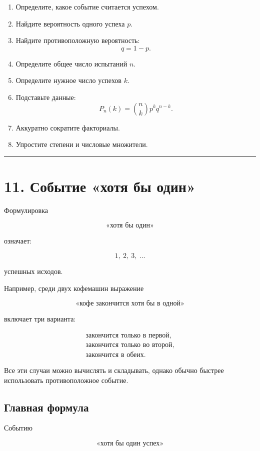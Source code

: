 \documentclass[a4paper,12pt]{article}
\newcommand{\accentline}{%
    \par\noindent
    {\color{accent}\rule{\linewidth}{0.7pt}}
    \par
}
\begin{document}
\begin{enumerate}
    \item Определите, какое событие считается успехом.
    \item Найдите вероятность одного успеха $p$.
    \item Найдите противоположную вероятность:
    \[
    q=1-p.
    \]
    \item Определите общее число испытаний $n$.
    \item Определите нужное число успехов $k$.
    \item Подставьте данные:
    \[
    P_n(k)
    =
    \binom{n}{k}p^kq^{n-k}.
    \]
    \item Аккуратно сократите факториалы.
    \item Упростите степени и числовые множители.
\end{enumerate}

\accentline

\section*{\color{darkaccent}11. Событие «хотя бы один»}

Формулировка

\[
\text{«хотя бы один»}
\]

означает:

\[
1,\ 2,\ 3,\ \ldots
\]

успешных исходов.

Например, среди двух кофемашин выражение

\[
\text{«кофе закончится хотя бы в одной»}
\]

включает три варианта:

\[
\begin{array}{c}
\text{закончится только в первой},\\
\text{закончится только во второй},\\
\text{закончится в обеих}.
\end{array}
\]

Все эти случаи можно вычислять и складывать, однако обычно быстрее использовать противоположное событие.

\subsection*{Главная формула}

Событию

\[
\text{«хотя бы один успех»}
\]
\end{document}
